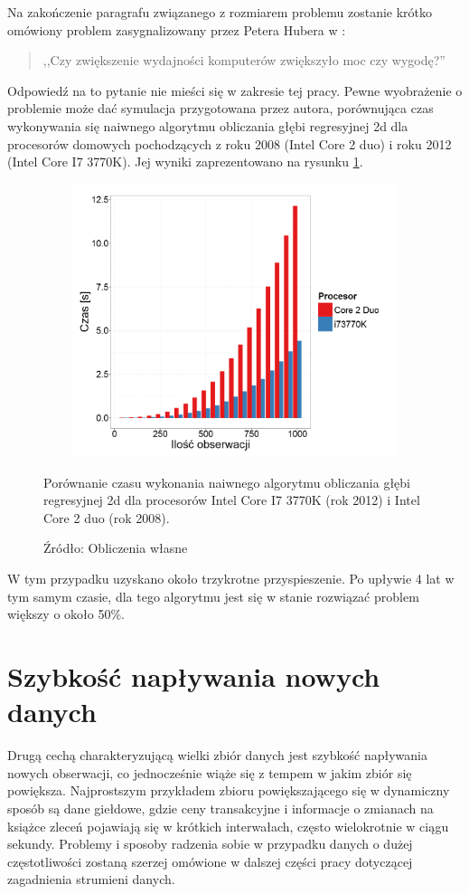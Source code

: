 \documentclass[man,mfu]{mgrwms}
\begin{document}
Na zakończenie paragrafu związanego z rozmiarem problemu zostanie krótko omówiony problem zasygnalizowany przez Petera Hubera w \cite{Huber2011}:

\begin{quote}
,,Czy zwiększenie wydajności komputerów zwiększyło moc czy wygodę?''
\end{quote}

Odpowiedź na to pytanie nie mieści się w zakresie tej pracy. Pewne wyobrażenie o problemie może  dać symulacja przygotowana przez autora, porównująca czas wykonywania się naiwnego algorytmu obliczania głębi regresyjnej 2d dla procesorów domowych pochodzących z roku 2008 (Intel Core 2 duo) i roku 2012 (Intel Core I7 3770K). Jej wyniki zaprezentowano na rysunku \ref{i7vs2duo}.

\begin{figure}[H]
\centering
\includegraphics[width=120mm,height = 80mm]{deepregtest}
\caption{Porównanie czasu wykonania naiwnego algorytmu obliczania głębi regresyjnej 2d dla procesorów Intel Core I7 3770K (rok 2012) i Intel Core 2 duo (rok 2008).}
\caption*{Źródło: Obliczenia własne}
\label{i7vs2duo}
\end{figure}

W tym przypadku uzyskano około trzykrotne przyspieszenie. Po upływie 4 lat w tym samym czasie, dla tego algorytmu jest się w stanie rozwiązać problem większy o około 50\%.

\section{Szybkość napływania nowych danych}

Drugą cechą charakteryzującą wielki zbiór danych jest szybkość napływania nowych obserwacji, co jednocześnie wiąże się z tempem w jakim zbiór się powiększa. Najprostszym przykładem zbioru powiększającego się w dynamiczny sposób są dane giełdowe, gdzie ceny transakcyjne i informacje o zmianach na książce zleceń pojawiają się w krótkich interwałach, często wielokrotnie w ciągu sekundy. Problemy i sposoby radzenia sobie w przypadku danych o dużej częstotliwości zostaną szerzej omówione w dalszej części pracy dotyczącej zagadnienia strumieni danych.
\end{document}
